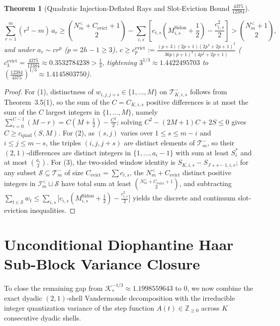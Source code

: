 \documentclass[11pt,a4paper]{article}
\newtheorem{theorem}{Theorem}[section]
\theoremstyle{remark}
\begin{document}
\begin{theorem}[Quadratic Injection-Deflated Rays and Slot-Eviction Bound $\frac{4375}{12384}$]
\begin{enumerate}
  \[
    \sum_{r=1}^m (r^2 - m)\,a_r \ge \binom{N_m^{<} + C_{\mathrm{evict}} + 1}{2} - \sum_{i, s} \left[c_{i, s}\left(M_{i, s}^{\mathrm{Sidon}} + \frac{1}{2}\right) - \frac{c_{i, s}^2}{2}\right] > \binom{N_m^{<} + 1}{2},
  \]
  and under $a_r \sim c r^p$ ($p = 2h - 1 \ge 3$), $c \ge c_p^{\mathrm{evict}} := \frac{(p+3)(2p+1)(2p^2+2p+1)^2}{36 p(p+1)^2(4p^2+2p+1)}$ ($c_3^{\mathrm{evict}} = \frac{4375}{12384} \approx 0.3532784238 > \frac{1}{3}$, tightening $3^{1/3} \approx 1.4422495703$ to $(\frac{12384}{4375})^{1/3} \approx 1.4145803750$).
\end{enumerate}
\end{theorem}

\begin{proof}
For (1), distinctness of $w_{i, j, j+s} \in \{1, \dots, M\}$ on $\mathcal{T}_{K, i, s}^-$ follows from Theorem~3.5(1), so the sum of the $C = C_{K, i, s}$ positive differences is at most the sum of the $C$ largest integers in $\{1, \dots, M\}$, namely $\sum_{r=0}^{C-1} (M - r) = C(M + \frac{1}{2}) - \frac{C^2}{2}$; solving $C^2 - (2M + 1)C + 2S \le 0$ gives $C \ge c_{\mathrm{quad}}(S, M)$. For (2), as $(s, j)$ varies over $1 \le s \le m - i$ and $i \le j \le m - s$, the triples $(i, j, j+s)$ are distinct elements of $\mathcal{T}_m^-$, so their $(2,1)$-differences are distinct integers in $\{1, \dots, a_i - 1\}$ with sum at least $S_i^*$ and at most $\binom{a_i}{2}$. For (3), the two-sided window identity is $S_{K, i, s} - S_{J+s-1, i, s}$; for any subset $\mathcal{S} \subseteq \mathcal{T}_m^-$ of size $C_{\mathrm{evict}} = \sum c_{i, s}$, the $N_m^{<} + C_{\mathrm{evict}}$ distinct positive integers in $\mathcal{I}_m^{<} \sqcup \mathcal{S}$ have total sum at least $\binom{N_m^{<} + C_{\mathrm{evict}} + 1}{2}$, and subtracting $\sum_{t \in \mathcal{S}} w_t \le \sum_{i, s} \bigl[c_{i, s}(M_{i, s}^{\mathrm{Sidon}} + \frac{1}{2}) - \frac{c_{i, s}^2}{2}\bigr]$ yields the discrete and continuum slot-eviction inequalities.
\end{proof}

\section{Unconditional Diophantine Haar Sub-Block Variance Closure}

To close the remaining gap from $\mathcal{K}_*^{-1/3} \approx 1.1998559643$ to $0$, we now combine the exact dyadic $(2,1)$-shell Vandermonde decomposition with the irreducible integer quantization variance of the step function $A(t) \in \mathbb{Z}_{\ge 0}$ across $K$ consecutive dyadic shells.
\end{document}
